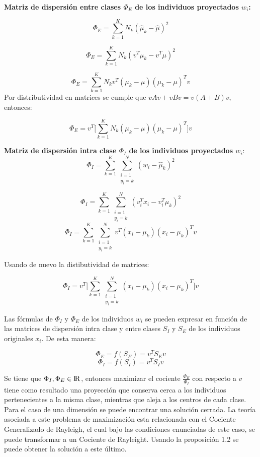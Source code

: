 \textbf{Matriz de dispersión entre clases $\Phi_{E}$ de los individuos proyectados $w_i$:}

$$\Phi_{E} = \sum\limits_{k =1}^{K} N_k (\widehat{\mu}_k - \widehat{\mu} )^2$$

$$\Phi_{E} = \sum\limits_{k =1}^{K} N_k (v^T \mu_k - v^T \mu)^2$$

$$\Phi_{E} =  \sum\limits_{k =1}^{K} N_k v^T ( \mu_k - \mu )(\mu_k - \mu )^T v $$
Por distributividad en matrices se cumple que $vAv+vBv =  v(A+B)v$, entonces:

\begin{equation}\label{eq:2.10}
\Phi_{E} = v^T \big[ \sum\limits_{k =1}^{K} N_k ( \mu_k - \mu )(\mu_k - \mu )^T \big] v	
\end{equation}

\textbf{Matriz de dispersión intra clase $\Phi_{I}$ de los individuos proyectados $w_i$}:
$$\Phi_{I} = \sum\limits_{k = 1}^{K} \sum\limits_{\substack{i = 1\\
                            y_i = k}}^{N} (w_i - \widehat{\mu}_k)^2 $$

$$\Phi_{I} = \sum\limits_{k = 1}^{K} \sum\limits_{\substack{i = 1\\
                            y_i = k}}^{N} (v_i^T x_i - v_i^T \mu_k)^{2} $$
$$\Phi_{I} =  \sum\limits_{k = 1}^{K} \sum\limits_{\substack{i = 1\\
                            y_i = k}}^{ N} v^T( x_i - \mu_k) ( x_i - \mu_k)^T v  $$

Usando de nuevo la distibutividad de matrices:

\begin{equation}\label{eq:2.11}
\Phi_{I} = v^T \big[ \sum\limits_{k = 1}^{K} \sum\limits_{\substack{i = 1\\
                            y_i = k}}^{ N} ( x_i - \mu_k) ( x_i - \mu_k)^T \big] v	
\end{equation}


 Las fórmulas de $\Phi_{I}$ y $\Phi_{E}$ de los individuos $w_i$ se pueden expresar en función de las matrices de dispersión intra clase y entre clases $S_I$ y $S_E$ de los individuos originales $x_i$. De esta manera:

 $$\Phi_{E} = f(S_E) = v^T S_E v$$
 $$\Phi_{I} = f(S_I) = v^T S_I v$$

Se tiene que $\Phi_{I}, \Phi_{E} \in {\rm I\!R}$, entonces maximizar el cociente $\frac{\Phi_{E}}{\Phi_{I}}$ con respecto a $v$ tiene como resultado una proyección que conserva cerca a los individuos pertenecientes a la misma clase, mientras que aleja a los centros de cada clase. Para el caso de una dimensión se puede encontrar una solución cerrada. La teoría asociada a este problema de maximización esta relacionada con el Cociente Generalizado de Rayleigh, el cual bajo las condiciones enunciadas de este caso, se puede transformar a un Cociente de Rayleight. Usando la proposición 1.2 se puede obtener la solución a este último.

